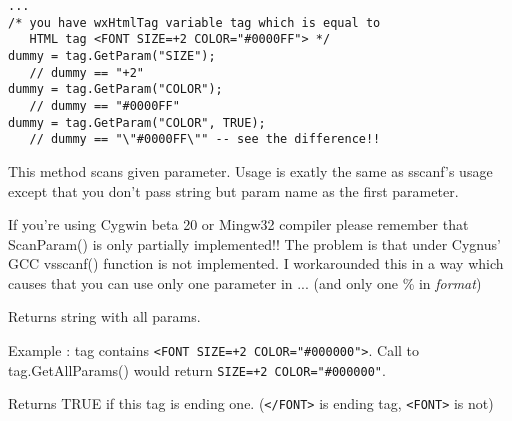 



\begin{verbatim}
...
/* you have wxHtmlTag variable tag which is equal to
   HTML tag <FONT SIZE=+2 COLOR="#0000FF"> */
dummy = tag.GetParam("SIZE");
   // dummy == "+2"
dummy = tag.GetParam("COLOR");
   // dummy == "#0000FF"
dummy = tag.GetParam("COLOR", TRUE);
   // dummy == "\"#0000FF\"" -- see the difference!!
\end{verbatim}



\label{wxhtmltagscanparam}


This method scans given parameter. Usage is exatly the same as sscanf's 
usage except that you don't pass string but param name as the first parameter.





If you're using Cygwin beta 20 or Mingw32 compiler please remember
that ScanParam() is only partially implemented!! The problem is
that under Cygnus' GCC vsscanf() function is not implemented. I workarounded
this in a way which causes that you can use only one parameter in ...
(and only one \% in {\it format})

\label{wxhtmltaggetallparams}


Returns string with all params. 

Example : tag contains {\tt <FONT SIZE=+2 COLOR="\#000000">}. Call to
tag.GetAllParams() would return {\tt SIZE=+2 COLOR="\#000000"}.

\label{wxhtmltagisending}


Returns TRUE if this tag is ending one.
({\tt </FONT>} is ending tag, {\tt <FONT>} is not)


